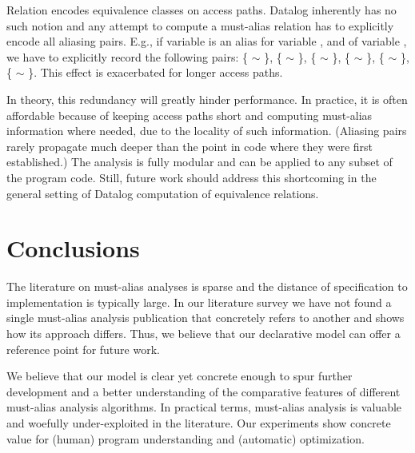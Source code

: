 \label{sec:must-logic:equivalence}
Relation  encodes equivalence classes on access paths. Datalog inherently has no such notion and any attempt to compute a must-alias relation has to explicitly encode all aliasing pairs. E.g., if variable  is an alias for variable , and  of variable , we have to explicitly record the following pairs: \{ $\sim$ \}, \{ $\sim$ \}, \{ $\sim$ \}, \{ $\sim$ \}, \{ $\sim$ \}, \{ $\sim$ \}. This effect is exacerbated for longer access paths.

In theory, this redundancy will greatly hinder performance. In practice, it is often affordable because of keeping access paths short and computing must-alias information where needed, due to the locality of such information. (Aliasing pairs rarely propagate much deeper than the point in code where they were first established.) The analysis is fully modular and can be applied to any subset of the program code. Still, future work should address this shortcoming in the general setting of Datalog computation of equivalence relations.


\section{Conclusions}

The literature on must-alias analyses is sparse and the distance of specification to implementation is typically large. In our literature survey we have not found a single must-alias analysis publication that concretely refers to another and shows how its approach differs. Thus, we believe that our declarative model can offer a reference point for future work.

We believe that our model is clear yet concrete enough to spur further development and a better understanding of the comparative features of different must-alias analysis algorithms. In practical terms, must-alias analysis is valuable and woefully under-exploited in the literature. Our experiments show concrete value for (human) program understanding and (automatic) optimization.